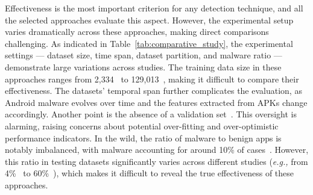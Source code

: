 Effectiveness is the most important criterion for any detection technique, and all the selected approaches evaluate this aspect.
However, the experimental setup varies dramatically across these approaches, making direct comparisons challenging.
As indicated in Table~\ref{tab:comparative_study}, the experimental settings --- dataset size, time span, dataset partition, and malware ratio --- demonstrate large variations across studies.
The training data size in these approaches ranges from 2,334~\cite{hou2017hindroid} to 129,013~\cite{arp2014drebin}, making it difficult to compare their effectiveness.
The datasets' temporal span further complicates the evaluation, as Android malware evolves over time and the features extracted from APKs change accordingly.
Another point is the absence of a validation set~\cite{he2022msdroid,li2021robust,wu2021android}.
This oversight is alarming, raising concerns about potential over-fitting and over-optimistic performance indicators.
In the wild, the ratio of malware to benign apps is notably imbalanced, with malware accounting for around 10\% of cases~\cite{pendlebury2019tesseract}.
However, this ratio in testing datasets significantly varies across different studies (\textit{e.g.,} from 4\%~\cite{arp2014drebin} to 60\%~\cite{hou2017hindroid}), which makes it difficult to reveal the true effectiveness of these approaches.


